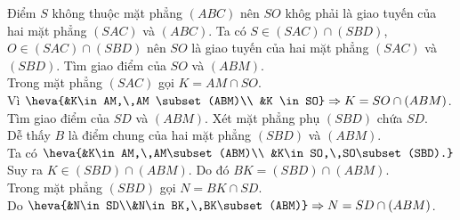 \begin{ex}
{\begin{center}
		\end{center}
		\begin{itemchoice}
			 \itemch
			Điểm  $S$ không thuộc mặt phẳng $(ABC)$ nên $SO$ khôg phải là giao tuyến của hai mặt phẳng $(SAC)$ và $(ABC)$.
			\itemch Ta có $S\in(SAC)\cap (SBD)$, $O\in (SAC)\cap (SBD)$ nên $S O$ là giao tuyến của hai mặt phẳng $(SAC)$ và  $(SBD)$.
			\itemch Tìm giao điểm của $SO$  và $(ABM)$.\\
			Trong mặt phẳng $(SAC)$ gọi  $K=AM\cap SO$.\\
			Vì $\heva{&K\in AM,\,AM  \subset(ABM)\\ &K \in SO}\Rightarrow K=SO\cap(ABM)$.
			\itemch Tìm giao điểm của  $SD$ và $(ABM)$. Xét mặt phẳng phụ $(SBD)$ chứa $SD$.\\
			Dễ thấy $B$ là điểm chung của hai mặt phẳng $(SBD)$  và $(ABM)$.\\
			Ta có $\heva{&K\in AM,\,AM\subset(ABM)\\ &K\in  SO,\,SO\subset(SBD).}$\\
			Suy  ra $K\in(SBD)\cap(ABM)$. Do đó $BK=(SBD)\cap(ABM)$.\\
			 Trong mặt phẳng $(SBD)$ gọi $N=BK\cap SD$.\\
			Do $\heva{&N\in SD\\&N\in  BK,\,BK\subset(ABM)}\Rightarrow N=SD\cap(ABM)$.
		\end{itemchoice}
	} 
\end{ex}


